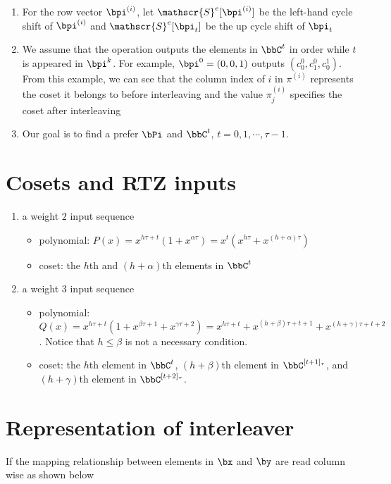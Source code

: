 \documentclass[11pt, oneside, dvipdfmx]{book}
\begin{document}
\begin{enumerate}
\item For the row vector $\bpi^{(i)}$, let $\mathscr{S}^e[\bpi^{(i)}]$ be the left-hand cycle shift of $\bpi^{(i)}$ and $\mathscr{S}^e[\bpi_t]$ be the up cycle shift of $\bpi_t$
\item We assume that the operation outputs the elements in $\bbC^t$ in order while $t$ is appeared in $\bpi^k$. For example, $\bpi^0 = (0,0,1)$ outputs $(c_0^0,c_1^0,c_0^1)$. From this example, we can see that the column index of $i$ in $\pi^{(i)}$ represents the coset it belongs to before interleaving and the value $\pi_{j}^{(i)}$ specifies the coset after interleaving
\item Our goal is to find a prefer $\bPi$ and $\bbC^t$, $t = 0,1,\cdots,\tau-1$.
\end{enumerate}


\section{Cosets and RTZ inputs}

\begin{enumerate}
\item a weight $2$ input sequence
\begin{itemize}
	\item polynomial: $P(x)=x^{h\tau+t}(1+x^{\alpha \tau}) = x^t(x^{h\tau}+x^{(h+\alpha)\tau})$
	\item coset: the $h$th and $(h+\alpha)$th elements in $\bbC^t$
\end{itemize}
\item a weight $3$ input sequence
\begin{itemize}
	\item polynomial: $Q(x) =x^{h\tau+t}(1+x^{\beta \tau +1}+x^{\gamma \tau +2})=x^{h\tau+t}+x^{(h+\beta) \tau +t+1}+x^{(h+\gamma) \tau +t+2}$. 
	Notice that $h \leq \beta$ is not a necessary condition.
	\item coset: the $h$th element in $\bbC^{t}$, $(h+\beta)$th element in $\bbC^{[t+1]_\tau}$, and $(h+\gamma)$th element in $\bbC^{[t+2]_\tau}$.
\end{itemize}
\end{enumerate}

\section{Representation of interleaver}
If the mapping relationship between elements in $\bx$ and $\by$ are read column wise as shown below
\end{document}
